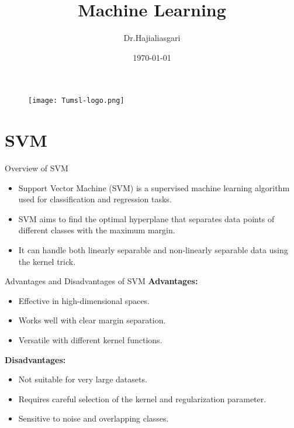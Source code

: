 \documentclass[serif, aspectratio=169]{beamer}
\author{Dr.Hajialiasgari}
\title{Machine Learning}
\institute{
    Tehran University \\
    Of\\
    Medical Science
}
\date{\small \today}
\begin{document}
\begin{frame}
    \titlepage
    \vspace*{-0.6cm}
    \begin{figure}[htpb]
        \begin{center}
            \texttt{[image: Tumsl-logo.png]}
        \end{center}
    \end{figure}
\end{frame}

\begin{frame}    
\tableofcontents[sectionstyle=show, subsectionstyle=show/shaded/hide, subsubsectionstyle=show/shaded/hide]
\end{frame}

\section{SVM}

\begin{frame}{Overview of SVM}
    \begin{itemize}
        \item Support Vector Machine (SVM) is a supervised machine learning algorithm used for classification and regression tasks.
        \item SVM aims to find the optimal hyperplane that separates data points of different classes with the maximum margin.
        \item It can handle both linearly separable and non-linearly separable data using the kernel trick.
    \end{itemize}
\end{frame}

\begin{frame}{Advantages and Disadvantages of SVM}
    \textbf{Advantages:}
    \begin{itemize}
        \item Effective in high-dimensional spaces.
        \item Works well with clear margin separation.
        \item Versatile with different kernel functions.
    \end{itemize}
    \textbf{Disadvantages:}
    \begin{itemize}
        \item Not suitable for very large datasets.
        \item Requires careful selection of the kernel and regularization parameter.
        \item Sensitive to noise and overlapping classes.
    \end{itemize}
\end{frame}
\end{document}
